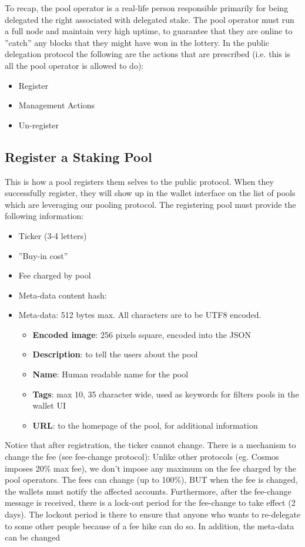 To recap, the pool operator is a real-life person responsible primarily for being delegated the right associated with delegated stake. The pool operator must run a full node and maintain very high uptime, to guarantee that they are online to ''catch'' any blocks that they might have won in the lottery.
In the public delegation protocol the following are the actions that are prescribed (i.e. this is all the pool operator is allowed to do):
\begin{itemize}
    \item Register
    \item Management Actions
    \item Un-register
\end{itemize}

\subsection{Register a Staking Pool}
This is how a pool registers them selves to the public protocol. When they successfully register, they will show up in the wallet interface on the list of pools which are leveraging our pooling protocol. 
The registering pool must provide the following information: 
\begin{itemize}
    \item Ticker (3-4 letters)
    \item ''Buy-in cost'' 
    \item Fee charged by pool
    \item Meta-data content hash: 
    \item Meta-data: 512 bytes max. All characters are to be UTF8 encoded. 
        \begin{itemize}
            \item \textbf{Encoded image}: 256 pixels square, encoded into the JSON
            \item \textbf{Description}: to tell the users about the pool
            \item \textbf{Name}: Human readable name for the pool
            \item \textbf{Tags}: max 10, 35 character wide, used as keywords for filters pools in the wallet UI
            \item \textbf{URL}: to the homepage of the pool, for additional information 
        \end{itemize}
\end{itemize}

Notice that after registration, the ticker cannot change. There is a mechanism to change the fee (see fee-change protocol): Unlike other protocols (eg. Cosmos imposes 20\% max fee), we don't impose any maximum on the fee charged by the pool operators. The fees can change (up to 100\%), BUT when the fee is changed, the wallets must notify the affected accounts. Furthermore, after the fee-change message is received, there is a lock-out period for the fee-change to take effect (2 days). The lockout period is there to ensure that anyone who wants to re-delegate to some other people because of a fee hike can do so. In addition, the meta-data can be changed   



